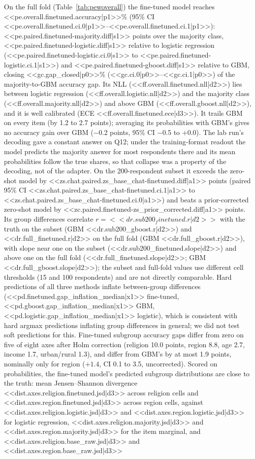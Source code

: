\documentclass[conference]{IEEEtran}
\begin{document}
On the full fold (Table~\ref{tab:pewoverall}) the fine-tuned model reaches <<pe.overall.finetuned.accuracy|p1>>\% (95\% CI <<pe.overall.finetuned.ci.0|p1>>--<<pe.overall.finetuned.ci.1|p1>>): <<pe.paired.finetuned-majority.diff|s1>> points over the majority class, <<pe.paired.finetuned-logistic.diff|s1>> relative to logistic regression (<<pe.paired.finetuned-logistic.ci.0|s1>> to <<pe.paired.finetuned-logistic.ci.1|s1>>) and <<pe.paired.finetuned-gboost.diff|s1>> relative to GBM, closing <<gc.gap_closed|p0>>\% (<<gc.ci.0|p0>>--<<gc.ci.1|p0>>) of the majority-to-GBM accuracy gap. Its NLL (<<ff.overall.finetuned.nll|d2>>) lies between logistic regression (<<ff.overall.logistic.nll|d2>>) and the majority class (<<ff.overall.majority.nll|d2>>) and above GBM (<<ff.overall.gboost.nll|d2>>), and it is well calibrated (ECE <<ff.overall.finetuned.ece|d3>>). It trails GBM on every item (by 1.2 to 2.7 points); averaging its probabilities with GBM's gives no accuracy gain over GBM ($-$0.2 points, 95\% CI $-$0.5 to $+$0.0). The lab run's decoding gave a constant answer on Q12; under the training-format readout the model predicts the majority answer for most respondents there and its mean probabilities follow the true shares, so that collapse was a property of the decoding, not of the adapter. On the 200-respondent subset it exceeds the zero-shot model by <<zs.chat.paired.zs_base_chat-finetuned.diff|a1>> points (paired 95\% CI <<zs.chat.paired.zs_base_chat-finetuned.ci.1|a1>> to <<zs.chat.paired.zs_base_chat-finetuned.ci.0|a1>>) and beats a prior-corrected zero-shot model by <<zc.paired.finetuned-zs_prior_corrected.diff|a1>> points. Its group differences correlate $r={<<dr.sub200_finetuned.r|d2>>}$ with the truth on the subset (GBM <<dr.sub200_gboost.r|d2>>) and <<dr.full_finetuned.r|d2>> on the full fold (GBM <<dr.full_gboost.r|d2>>), with slope near one on the subset (<<dr.sub200_finetuned.slope|d2>>) and above one on the full fold (<<dr.full_finetuned.slope|d2>>; GBM <<dr.full_gboost.slope|d2>>); the subset and full-fold values use different cell thresholds (15 and 100 respondents) and are not directly comparable. Hard predictions of all three methods inflate between-group differences (<<pd.finetuned.gap_inflation_median|x1>> fine-tuned, <<pd.gboost.gap_inflation_median|x1>> GBM, <<pd.logistic.gap_inflation_median|x1>> logistic), which is consistent with hard argmax predictions inflating group differences in general; we did not test soft predictions for this. Fine-tuned subgroup accuracy gaps differ from zero on five of eight axes after Holm correction (religion 10.0 points, region 8.8, age 2.7, income 1.7, urban/rural 1.3), and differ from GBM's by at most 1.9 points, nominally only for region ($+1.4$, CI 0.1 to 3.5, uncorrected). Scored on probabilities, the fine-tuned model's predicted subgroup distributions are close to the truth: mean Jensen--Shannon divergence <<dist.axes.religion.finetuned.jsd|d3>> across religion cells and <<dist.axes.region.finetuned.jsd|d3>> across region cells, against <<dist.axes.religion.logistic.jsd|d3>> and <<dist.axes.region.logistic.jsd|d3>> for logistic regression, <<dist.axes.religion.majority.jsd|d3>> and <<dist.axes.region.majority.jsd|d3>> for the item marginal, and <<dist.axes.religion.base_raw.jsd|d3>> and <<dist.axes.region.base_raw.jsd|d3>> 
\end{document}
